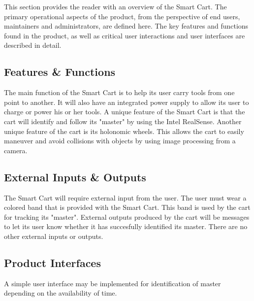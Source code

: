 This section provides the reader with an overview of the Smart Cart. The primary operational aspects of the product, from the perspective of end users, maintainers and administrators, are defined here. The key features and functions found in the product, as well as critical user interactions and user interfaces are described in detail.

\subsection{Features \& Functions}
The main function of the Smart Cart is to help its user carry tools from one point to another. It will also have an integrated power supply to allow its user to charge or power his or her tools. A unique feature of the Smart Cart is that the cart will identify and follow its "master" by using the Intel RealSense. Another unique feature of the cart is its holonomic wheels. This allows the cart to easily maneuver and avoid collisions with objects by using image processing from a camera. 

\subsection{External Inputs \& Outputs}
The Smart Cart will require external input from the user. The user must wear a colored band that is provided with the Smart Cart. This band is used by the cart for tracking its "master". External outputs produced by the cart will be messages to let its user know whether it has succesfully identified its master. There are no other external inputs or outputs.

\subsection{Product Interfaces}
A simple user interface may be implemented for identification of master depending on the availability of time. 
